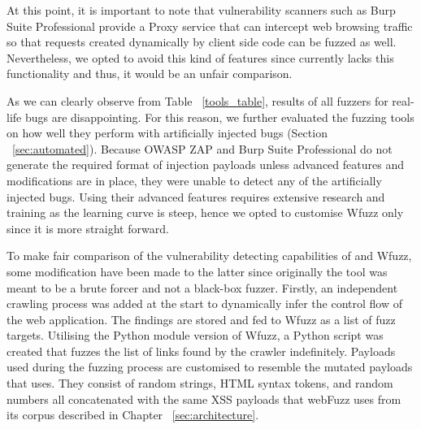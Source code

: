 At this point, it is important to note that vulnerability scanners such as Burp Suite Professional provide a Proxy service that can intercept web browsing traffic so that requests created dynamically by client side code can be fuzzed as well. Nevertheless, we opted to avoid this kind of features since \pname{} currently lacks this functionality and thus, it would be an unfair comparison.

As we can clearly observe from Table ~\ref{tools_table}, results of all fuzzers for real-life bugs are disappointing. For this reason, we further evaluated the fuzzing tools on how well they perform with artificially injected bugs (Section ~\ref{sec:automated}). Because OWASP ZAP and Burp Suite Professional do not generate the required format of injection payloads unless advanced features and modifications are in place, they were unable to detect any of the artificially injected bugs. Using their advanced features requires extensive research and training as the learning curve is steep, hence we opted to customise Wfuzz only since it is more straight forward.

To make fair comparison of the vulnerability detecting capabilities of \pname{} and Wfuzz, some modification have been made to the latter since originally the tool was meant to be a brute forcer and not a black-box fuzzer. Firstly, an independent crawling process was added at the start to dynamically infer the control flow of the web application. The findings are stored and fed to Wfuzz as a list of fuzz targets. Utilising the Python module version of Wfuzz, a Python script was created that fuzzes the list of links found by the crawler indefinitely. Payloads used during the fuzzing process are customised to resemble the mutated payloads that \pname{} uses. They consist of random strings, HTML syntax tokens, and random numbers all concatenated with the same XSS payloads that webFuzz uses from its corpus described in Chapter ~\ref{sec:architecture}.

